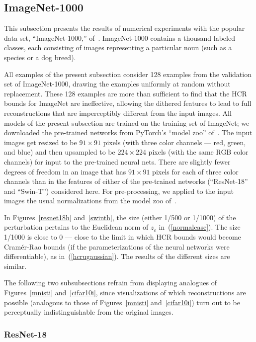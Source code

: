 \documentclass[]{fairmeta}
\renewcommand{\epsilon}{\varepsilon}
\begin{document}
\subsection{ImageNet-1000}
\label{imagenet}

This subsection presents the results of numerical experiments
with the popular data set, ``ImageNet-1000,'' of~\cite{imagenet}.
ImageNet-1000 contains a thousand labeled classes, each consisting
of images representing a particular noun (such as a species or a dog breed).

All examples of the present subsection consider 128 examples
from the validation set of ImageNet-1000, drawing the examples uniformly
at random without replacement. These 128 examples are more than sufficient
to find that the HCR bounds for ImageNet are ineffective,
allowing the dithered features to lead to full reconstructions
that are imperceptibly different from the input images. 
All models of the present subsection are trained
on the training set of ImageNet;
we downloaded the pre-trained networks from PyTorch's ``model zoo''
of~\cite{torchvision}.
The input images get resized to be $91 \times 91$ pixels
(with three color channels --- red, green, and blue)
and then upsampled to be $224 \times 224$ pixels
(with the same RGB color channels) for input to the pre-trained neural nets.
There are slightly fewer degrees of freedom in an image
that has $91 \times 91$ pixels for each of three color channels
than in the features of either of the pre-trained networks
(``ResNet-18'' and ``Swin-T'') considered here.
For pre-processing, we applied to the input images the usual normalizations
from the model zoo of~\cite{torchvision}.

In Figures~\ref{resnet18h} and~\ref{swinth}, the size (either 1/500 or 1/1000)
of the perturbation pertains to the Euclidean norm of $z_{\epsilon}$
in~(\ref{normalcase}).
The size 1/1000 is close to 0 --- close to the limit in which HCR bounds
would become Cram\'er-Rao bounds (if the parameterizations
of the neural networks were differentiable), as in~(\ref{hcrugaussian}).
The results of the different sizes are similar.

The following two subsubsections refrain from displaying
analogues of Figures~\ref{mnisti} and~\ref{cifar10i},
since visualizations of which reconstructions are possible (analogous to those
of Figures~\ref{mnisti} and~\ref{cifar10i}) turn out to be perceptually
indistinguishable from the original images.

\subsubsection{ResNet-18}
\label{resnet-18}
\end{document}
